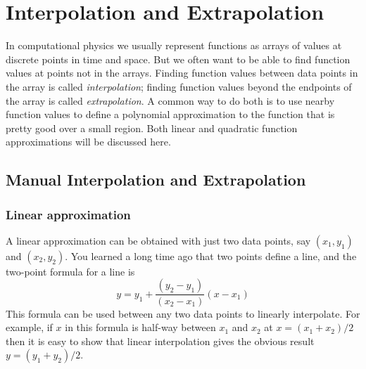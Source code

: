 \chapter{Interpolation and Extrapolation}

\label{chap:interp} 

In computational physics we usually represent functions as arrays of values at
discrete points in time and space. But we often want to be able to find
function values at points not in the arrays. Finding function values between
data points in the array is called {\it interpolation}; finding function
values beyond the endpoints of the array is called {\it extrapolation}. A
common way to do both is to use nearby function values to define a polynomial
approximation to the function that is pretty good over a small region.  Both
linear and quadratic function approximations will be discussed here.

%
%
%


\medskip


\section{Manual Interpolation and Extrapolation}

\subsection*{Linear approximation}
A linear approximation can be obtained with just two data points,
say $(x_1,y_1)$ and $(x_2,y_2)$. You learned a long time ago that
two points define a line, and the two-point formula for a line
is
\begin{equation}
y = y_1+ \frac{(y_2-y_1) }{ (x_2-x_1)} (x-x_1)
\end{equation}
This formula can be used between any two data points to linearly
interpolate. For example, if $x$ in this formula is half-way between
$x_1$ and $x_2$ at $x=(x_1+x_2)/2$ then it is easy to show that
linear interpolation gives the obvious result $y=(y_1+y_2)/2$.

